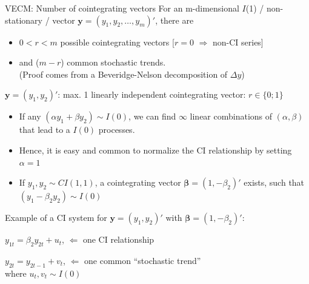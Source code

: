 \documentclass[usenames,dvipsnames]{beamer}
\begin{document}
\begin{frame}{VECM: Number of cointegrating vectors}
\footnotesize
For an m-dimensional $I$(1) / non-stationary / vector $\bm{y}=(y_1, y_2, \dots, y_m)'$, there are
\begin{itemize}
\item $0 < r < m$ possible cointegrating vectors [$r=0$ $\Rightarrow$ non-CI series]
\item and ($m-r$) common stochastic trends.\\
(Proof comes from a Beveridge-Nelson decomposition of $\Delta y$)
\end{itemize}
$\bm{y} = (y_1, y_2)'$: max. 1 linearly independent cointegrating vector: $r \in \{0;1\}$
\begin{itemize}
\item If any $(\alpha y_1 + \beta y_2) \sim I(0)$, we can find $\infty$ linear combinations of $(\alpha, \beta)$ that lead to a $I(0)$ processes.
\item Hence, it is easy and common to normalize the CI relationship by setting $\alpha=1$
\item If $y_1, y_2 \sim CI(1,1)$, a cointegrating vector $\bm{\beta} = (1, -\beta_2)'$ exists, such that $(y_1 - \beta_2 y_2) \sim I(0)$
\end{itemize}
Example of a CI system for $\bm{y} = (y_1, y_2)'$ with $\bm{\beta} = (1, -\beta_2)'$:
\begin{enumerate}[ {[}1{]} ]
\item $y_{1t} = \beta_2 y_{2t} + u_t$, \qquad $\Leftarrow$ one CI relationship
\item $y_{2t} = y_{2t-1} + v_t$, \qquad $\Leftarrow$ one common ``stochastic trend''\\
where $u_t, v_t \sim I(0)$
\end{enumerate}
\end{frame}
\end{document}
